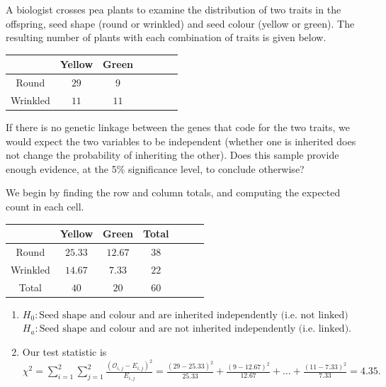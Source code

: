 \begin{example}
A biologist crosses pea plants to examine the distribution of two traits in the offspring, seed shape (round or wrinkled) and seed colour (yellow or green). The resulting number of plants with each combination of traits is given below.
\renewcommand{\arraystretch}{1.25}
\begin{center}
\begin{tabular}{|c|c|c|c|c|c|c|}
\hline
 & Yellow & Green \\
\hline
Round & $29$ & $9$  \\
\hline
Wrinkled & $11$ & $11$ \\
\hline
\end{tabular}
\end{center}

If there is no genetic linkage between the genes that code for the two traits, we would expect the two variables to be independent (whether one is inherited does not change the probability of inheriting the other). Does this sample provide enough evidence, at the 5\% significance level, to conclude otherwise? 

We begin by finding the row and column totals, and computing the expected count in each cell.
\renewcommand{\arraystretch}{1.25}
\begin{center}
\begin{tabular}{|c|c|c|c|c|c|c|}
\hline
 & Yellow & Green & Total \\
\hline
Round & $25.33$ & $12.67$ & $38$ \\
\hline
Wrinkled & $14.67$ & $7.33$ & $22$ \\
\hline
Total & $40$ & $20$ & $60$ \\
\hline
\end{tabular}
\end{center}

\begin{enumerate}[label=\textnormal{\Roman*}.]
\item $H_0: \text{Seed shape and colour and are inherited independently (i.e. not linked)}$ \\
$H_a: \text{Seed shape and colour and are not inherited independently (i.e. linked)}$.

\item Our test statistic is $\chi^2 = \sum_{i=1}^2\sum_{j=1}^2 \frac{(\mathcal{O}_{i,j} - E_{i,j})^2}{E_{i,j}} = \frac{(29-25.33)^2}{25.33} + \frac{(9-12.67)^2}{12.67} + \dots + \frac{(11-7.33)^2}{7.33} = 4.35.$ \\


\end{enumerate}
\end{example}
